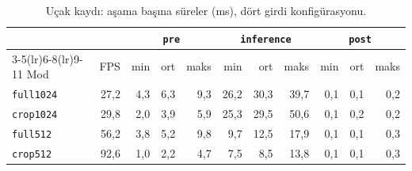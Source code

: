 \begin{table}[H]
  \centering
  \caption{Uçak kaydı: aşama başına süreler (ms), dört girdi
    konfigürasyonu.}
  \label{tab:kayit-ucak}
  \footnotesize
  \begin{tabular}{lr rrr rrr rrr}
    \toprule
    & & \multicolumn{3}{c}{\texttt{pre}}
      & \multicolumn{3}{c}{\texttt{inference}}
      & \multicolumn{3}{c}{\texttt{post}} \\
    \cmidrule(lr){3-5}\cmidrule(lr){6-8}\cmidrule(lr){9-11}
    Mod & FPS & min & ort & maks & min & ort & maks & min & ort & maks \\
    \midrule
    \texttt{full1024} & 27,2 & 4,3 & 6,3 & 9,3 & 26,2 & 30,3 & 39,7 & 0,1 & 0,1 & 0,2 \\
    \texttt{crop1024} & 29,8 & 2,0 & 3,9 & 5,9 & 25,3 & 29,5 & 50,6 & 0,1 & 0,2 & 0,2 \\
    \texttt{full512}  & 56,2 & 3,8 & 5,2 & 9,8 & 9,7  & 12,5 & 17,9 & 0,1 & 0,1 & 0,3 \\
    \texttt{crop512}  & 92,6 & 1,0 & 2,2 & 4,7 & 7,5  & 8,5  & 13,8 & 0,1 & 0,1 & 0,3 \\
    \bottomrule
  \end{tabular}
\end{table}
